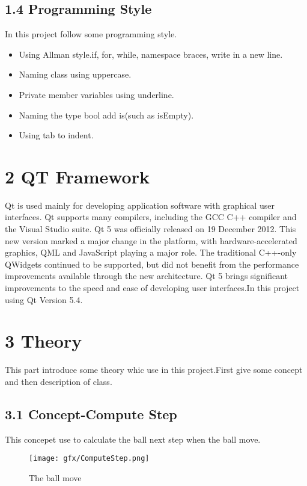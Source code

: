 \documentclass[a4,10pt]{article}
\begin{document}
   \subsection*{1.4 Programming Style}
In this project follow some programming style.
 \begin{itemize}
\item Using Allman style.if, for, while, namespace braces, write in a new line.
\item Naming class using uppercase.
\item  Private member variables using underline.
\item Naming the type bool add is(such as isEmpty).
\item Using tab to indent.
\end{itemize}


  \section{2 QT Framework}

Qt is used mainly for developing application software with graphical user interfaces.
 Qt supports many compilers, including the GCC C++ compiler and the Visual Studio suite.
Qt 5 was officially released on 19 December 2012. This new version marked a major change in the platform, with hardware-accelerated graphics, QML and JavaScript playing a major role. The traditional C++-only QWidgets continued to be supported, but did not benefit from the performance improvements available through the new architecture.\cite{IEEEhowto:two} Qt 5 brings significant improvements to the speed and ease of developing user interfaces.\cite{IEEEhowto:three}In this project using Qt 
Version 5.4.


  \section{3 Theory}
This part introduce some theory whic use in this project.First give some concept and then description of class.
   \subsection*{3.1 Concept-Compute Step}
    This concepet use to calculate the ball next step when the ball move.
    \begin{figure}[H]
      \centering
      \texttt{[image: gfx/ComputeStep.png]}


      \caption{The ball move}
      \label{fig:fi}
    \end{figure}
\end{document}
